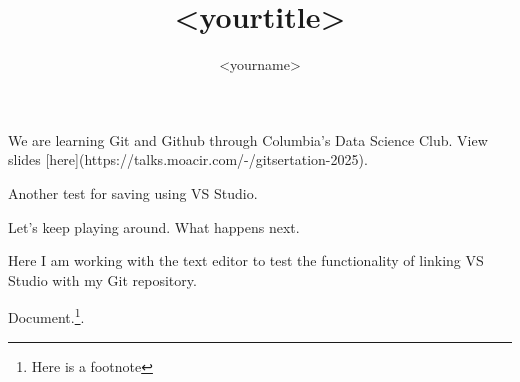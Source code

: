 \documentclass{article}
\title{<yourtitle>}
\author{<yourname>}
\begin{document}
We are learning Git and Github through Columbia's Data Science Club. View slides [here](https://talks.moacir.com/-/gitsertation-2025).

Another test for saving using VS Studio. 

Let's keep playing around. What happens next. 

Here I am working with the text editor to test the functionality of linking VS Studio with my Git repository. 
\maketitle

Document.\footnote{Here is a footnote}.
\end{document}
